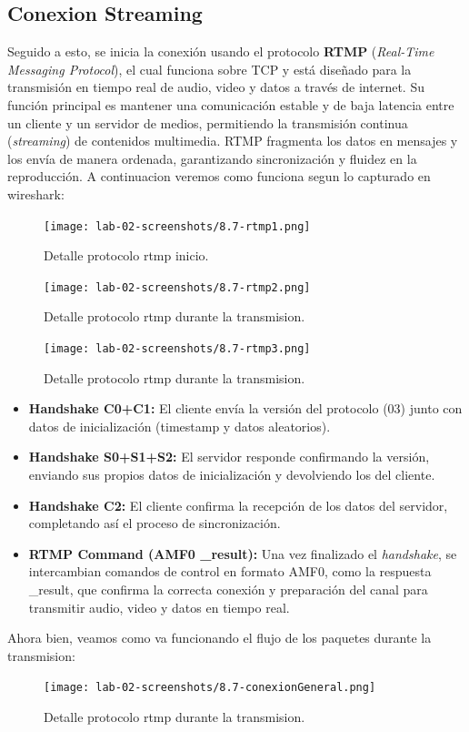 \documentclass[10pt]{article}
\begin{document}
\subsection{Conexion Streaming}

Seguido a esto, se inicia la conexión usando el protocolo \textbf{RTMP} (\textit{Real-Time Messaging Protocol}), el cual funciona sobre TCP y está diseñado 
para la transmisión en tiempo real de audio, video y datos a través de internet.  Su función principal es mantener una comunicación estable y de baja latencia entre un cliente y un servidor de medios, permitiendo la transmisión continua (\textit{streaming}) de contenidos multimedia. RTMP fragmenta los datos en mensajes y los envía de manera ordenada, garantizando sincronización y fluidez en la reproducción. A continuacion veremos como funciona segun lo capturado en wireshark:

\begin{figure}[H]
    \centering
    \texttt{[image: lab-02-screenshots/8.7-rtmp1.png]}
    \caption{Detalle protocolo rtmp inicio.}
\end{figure}
\begin{figure}[H]
    \centering
    \texttt{[image: lab-02-screenshots/8.7-rtmp2.png]}
    \caption{Detalle protocolo rtmp durante la transmision.}
\end{figure}
\begin{figure}[H]
    \centering
    \texttt{[image: lab-02-screenshots/8.7-rtmp3.png]}
    \caption{Detalle protocolo rtmp durante la transmision.}
\end{figure}

\begin{itemize}
    \item \textbf{Handshake C0+C1:} El cliente envía la versión del protocolo (03) 
    junto con datos de inicialización (timestamp y datos aleatorios).
    \item \textbf{Handshake S0+S1+S2:} El servidor responde confirmando la versión, 
    enviando sus propios datos de inicialización y devolviendo los del cliente.
    \item \textbf{Handshake C2:} El cliente confirma la recepción de los datos del servidor, 
    completando así el proceso de sincronización.
    \item \textbf{RTMP Command (AMF0 \_result):} Una vez finalizado el \textit{handshake}, 
    se intercambian comandos de control en formato AMF0, como la respuesta \_result, 
    que confirma la correcta conexión y preparación del canal para transmitir audio, 
    video y datos en tiempo real.
\end{itemize}
Ahora bien, veamos como va funcionando el flujo de los paquetes durante la transmision:
\begin{figure}[H]
    \centering
    \texttt{[image: lab-02-screenshots/8.7-conexionGeneral.png]}
    \caption{Detalle protocolo rtmp durante la transmision.}
\end{figure}
\end{document}
